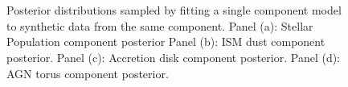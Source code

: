 \begin{figure}
    \quad
  \\
  \quad
  \\

  \caption{Posterior distributions sampled by fitting a single component model to synthetic data from the same component. Panel (a): Stellar Population component posterior Panel (b): ISM dust component posterior. Panel (c): Accretion disk component posterior. Panel (d): AGN torus component posterior.}
  \label{fig:ComponentPosterior}
\end{figure}
